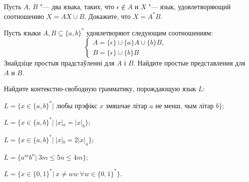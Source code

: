 \documentclass[12pt, a4paper]{article}
\begin{document}
\begin{problemList}
{Пусть $A$, $B$ "--- два языка, таких, что $\epsilon \not\in A$ и $X$ "--- язык,
удовлетворяющий соотношению $X=AX\cup B$. Докажите, что $X=A^*B$.}

\bigskip

{Пусть языки $A, B\subseteq \{a, b\}^*$ удовлетворяют следующим соотношениям:}
{%
\[
\begin{cases}
A=\{\epsilon\}\cup\{a\}A\cup\{b\}B, \\
B=\{\epsilon\}\cup\{b\}B
\end{cases}
\]
}
{Знайдзіце простыя прадстаўленні для $A$ і $B$.}
{Найдите простые представления для $A$ и $B$.}

\bigskip

{Найдите контекстно-свободную грамматику, порождающую язык $L$:}
{%
\begin{belarusianEnumerate}
    \item $L=\{x\in\{a, b\}^*|\text{ любы прэфікс } x \text{ змяшчае літар } a \text{ не менш, чым літар } b\}$;
    \item $L=\{x\in\{a, b\}^*|\ |x|_a = |x|_b\}$;
    \item $L=\{x\in\{a, b\}^*|\ |x|_b = 2|x|_a\}$;
    \item $L=\{a^mb^n|\ 3m \le 5n\le 4m\}$;
    \item $L=\{x\in \{0, 1\}^*|\ x\neq ww\ \forall w\in \{0, 1\}^*\}$.
\end{belarusianEnumerate}
}

\end{problemList}
\end{document}
